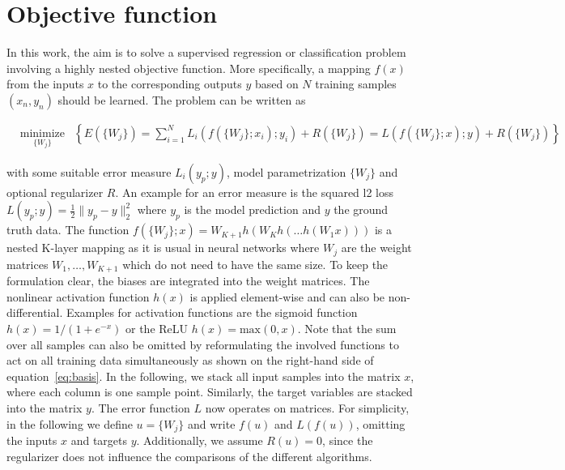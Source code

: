\documentclass[english,11pt,a4paper]{article}
\begin{document}

\section{Objective function}

In this work, the aim is to solve a supervised regression or classification problem involving a highly nested objective function. More specifically, a mapping $f(x)$ from the inputs $x$ to the corresponding outputs $y$ based on $N$ training samples $(x_n, y_n)$ should be learned. The problem can be written as

\begin{equation}
	\begin{aligned}
		& \underset{\{W_j\}}{\text{minimize}}
		& \left\{ E(\{W_j\}) = \sum_{i=1}^{N} L_i(f(\{W_j\};x_i);y_i) + R(\{W_j\})
		= L(f(\{W_j\};x);y) + R(\{W_j\}) \right\}
	\end{aligned}
	\label{eq:basis}
\end{equation}

with some suitable error measure $L_i(y_p;y)$, model parametrization $\{W_j\}$ and optional regularizer $R$. An example for an error measure is the squared l2 loss $L(y_p;y) = \frac{1}{2} \| y_p - y \|^2_2$ where $y_p$ is the model prediction and $y$ the ground truth data. The function $f(\{W_j\};x) = W_{K+1}h(W_Kh(\dots h(W_1x)))$ is a nested K-layer mapping as it is usual in neural networks where $W_j$ are the weight matrices $W_1,\dots,W_{K+1}$ which do not need to have the same size. To keep the formulation clear, the biases are integrated into the weight matrices. The nonlinear activation function $h(x)$ is applied element-wise and can also be non-differential. Examples for activation functions are the sigmoid function $h(x) = 1/(1 + e^{-x})$ or the ReLU $h(x) = \mathrm{max}(0, x)$. Note that the sum over all samples can also be omitted by reformulating the involved functions to act on all training data simultaneously as shown on the right-hand side of equation~\ref{eq:basis}. In the following, we stack all input samples into the matrix $x$, where each column is one sample point. Similarly, the target variables are stacked into the matrix $y$. The error function $L$ now operates on matrices. For simplicity, in the following we define $u = \{W_j\}$ and write $f(u)$ and $L(f(u))$, omitting the inputs $x$ and targets $y$. Additionally, we assume $R(u) = 0$, since the regularizer does not influence the comparisons of the different algorithms.
\end{document}
